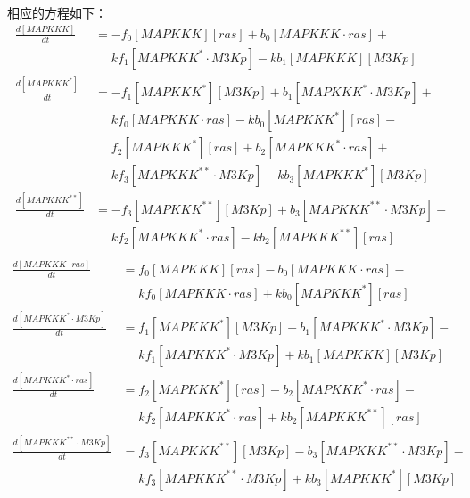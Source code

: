 相应的方程如下：
\small
\begin{equation*}
  \begin{align*}
    \frac{d[MAPKKK]}{dt} &= -f_{0}[MAPKKK][ras] + b_{0}[MAPKKK\cdot{}ras] +\\
    &\phantom{=} kf_{1}[MAPKKK^{*}\cdot{}M3Kp] - kb_{1}[MAPKKK][M3Kp]\\
    \frac{d[MAPKKK^{*}]}{dt} &= -f_{1}[MAPKKK^{*}][M3Kp] + b_{1}[MAPKKK^{*}\cdot{}M3Kp] +\\
    &\phantom{=} kf_{0}[MAPKKK\cdot{}ras] - kb_{0}[MAPKKK^{*}][ras] -\\
    &\phantom{=} f_{2}[MAPKKK^{*}][ras] + b_{2}[MAPKKK^{*}\cdot{}ras] +\\
    &\phantom{=} kf_{3}[MAPKKK^{**}\cdot{}M3Kp] - kb_{3}[MAPKKK^{*}][M3Kp]\\
    \frac{d[MAPKKK^{**}]}{dt} &= -f_{3}[MAPKKK^{**}][M3Kp] + b_{3}[MAPKKK^{**}\cdot{}M3Kp] +\\
    &\phantom{=} kf_{2}[MAPKKK^{*}\cdot{}ras] - kb_{2}[MAPKKK^{**}][ras]\\
  \end{align*}
\end{equation*}
\begin{equation*}
  \begin{align*}
    \frac{d[MAPKKK\cdot{}ras]}{dt} &= f_{0}[MAPKKK][ras] - b_{0}[MAPKKK\cdot{}ras] -\\
    &\phantom{=} kf_{0}[MAPKKK\cdot{}ras] + kb_{0}[MAPKKK^{*}][ras]\\
    \frac{d[MAPKKK^{*}\cdot{}M3Kp]}{dt} &= f_{1}[MAPKKK^{*}][M3Kp] - b_{1}[MAPKKK^{*}\cdot{}M3Kp] -\\
    &\phantom{=} kf_{1}[MAPKKK^{*}\cdot{}M3Kp] + kb_{1}[MAPKKK][M3Kp]\\
    \frac{d[MAPKKK^{*}\cdot{}ras]}{dt} &= f_{2}[MAPKKK^{*}][ras] - b_{2}[MAPKKK^{*}\cdot{}ras] -\\
    &\phantom{=} kf_{2}[MAPKKK^{*}\cdot{}ras] + kb_{2}[MAPKKK^{**}][ras]\\
    \frac{d[MAPKKK^{**}\cdot{}M3Kp]}{dt} &= f_{3}[MAPKKK^{**}][M3Kp] - b_{3}[MAPKKK^{**}\cdot{}M3Kp] -\\
    &\phantom{=} kf_{3}[MAPKKK^{**}\cdot{}M3Kp] + kb_{3}[MAPKKK^{*}][M3Kp]\\
  \end{align*}
\end{equation*}

